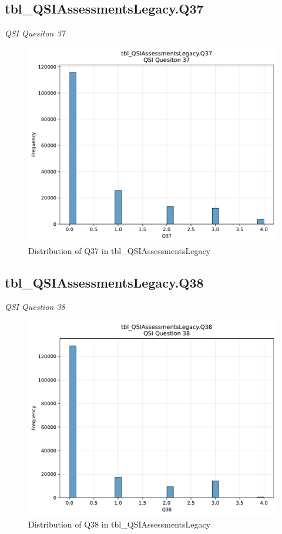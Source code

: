 \subsection{tbl\_QSIAssessmentsLegacy.Q37}
\textit{QSI Quesiton 37}

\begin{figure}[htbp]
\centering
\includegraphics[width=\textwidth]{figures/dbo_tbl_QSIAssessmentsLegacy_Q37.pdf}
\caption{Distribution of Q37 in tbl\_QSIAssessmentsLegacy}
\end{figure}\newpage

\subsection{tbl\_QSIAssessmentsLegacy.Q38}
\textit{QSI Question 38}

\begin{figure}[htbp]
\centering
\includegraphics[width=\textwidth]{figures/dbo_tbl_QSIAssessmentsLegacy_Q38.pdf}
\caption{Distribution of Q38 in tbl\_QSIAssessmentsLegacy}
\end{figure}\newpage

